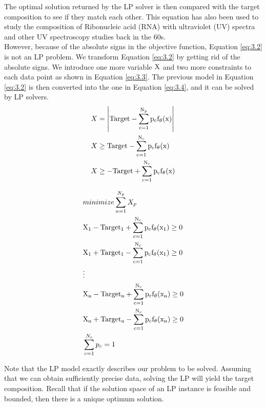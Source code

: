The optimal solution returned by the LP solver is then compared with the target composition to see if they match each other. This equation has also been used to study the composition of Ribonucleic acid (RNA) with ultraviolet (UV) spectra \cite{NYAS:NYAS900} and other UV spectroscopy studies  \cite{LPATUAS} back in the 60s. \\

However, because of the absolute signs in the objective function, Equation \ref{eq:3.2} is not an LP problem. We transform Equation \ref{eq:3.2} by getting rid of the absolute signs. We introduce one more variable $\rm X$ and two more constraints to each data point as shown in Equation \ref{eq:3.3}. The previous model in Equation \ref{eq:3.2} is then converted into the one in Equation \ref{eq:3.4}, and it can be solved by LP solvers. \\

\begin{eqnarray} \label{eq:3.3}
& X = \left| \rm Target-\displaystyle\sum^{N_{p}}_{c=1}p_{c}f_{\theta}(x) \right| \nonumber \\
&  X \geq \rm Target-\displaystyle\sum^{N_{c}}_{c=1}p_{c}f_{\theta}(x)   \nonumber \\
& X \geq -\rm Target+\displaystyle\sum^{N_{c}}_{c=1}p_{c}f_{\theta}(x)  
\end{eqnarray} 

\begin{eqnarray} \label{eq:3.4}
& minimize \displaystyle\sum^{N_{p}}_{n=1} X_p \nonumber \\
& \rm X_1 - \rm Target_1 + \displaystyle\sum^{N_{c}}_{c=1}p_{c}f_{\theta}(x_1) \geq 0 \nonumber \\
& \rm X_1 + \rm Target_1 - \displaystyle\sum^{N_{c}}_{c=1}p_{c}f_{\theta}(x_1) \geq 0 \nonumber \\
&\vdots  \nonumber \\
& \rm X_n - \rm Target_n + \displaystyle\sum^{N_{c}}_{c=1}p_{c}f_{\theta}(x_n) \geq 0 \nonumber \\
& \rm X_n + \rm Target_n - \displaystyle\sum^{N_{c}}_{c=1}p_{c}f_{\theta}(x_n) \geq 0 \nonumber \\
& \displaystyle\sum^{N_{c}}_{c=1}p_{c} = 1 
\end{eqnarray} 

Note that the LP model exactly describes our problem to be solved. Assuming that we can obtain sufficiently precise data, solving the LP will yield the target composition. Recall that if the solution space of an LP instance is feasible and bounded, then there is a unique optimum solution. \\

